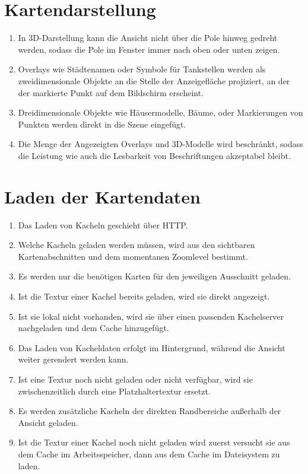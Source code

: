 \documentclass[10pt]{scrreprt}
\begin{document}
\section{Kartendarstellung}
\begin{enumerate}[leftmargin=2cm,resume]
\item In 3D-Darstellung kann die Ansicht nicht über die Pole hinweg gedreht werden, sodass die Pole im Fenster immer nach oben oder unten zeigen.
\item Overlays wie Städtenamen oder Symbole für Tankstellen werden als zweidimensionale Objekte an die Stelle der Anzeigefläche projiziert, an der der markierte Punkt auf dem Bildschirm erscheint.
\item \W Dreidimensionale Objekte wie Häusermodelle, Bäume, oder  Markierungen von Punkten werden direkt in die Szene eingefügt.
\item \W Die Menge der Angezeigten Overlays und 3D-Modelle wird beschränkt, sodass die Leistung wie auch die Lesbarkeit von Beschriftungen akzeptabel bleibt.
\end{enumerate}

\section{Laden der Kartendaten}
\begin{enumerate}[resume,leftmargin=2cm]
\item Das Laden von Kacheln geschieht über HTTP.
\item Welche Kacheln geladen werden müssen, wird  aus den sichtbaren Kartenabschnitten und dem momentanen Zoomlevel bestimmt.
\item Es werden nur die benötigen Karten für den jeweiligen Ausschnitt geladen.
\item Ist die Textur einer Kachel bereits geladen, wird sie direkt angezeigt.
\item Ist sie lokal nicht vorhanden, wird sie über einen passenden Kachelserver nachgeladen und dem Cache hinzugefügt.
\item Das Laden von Kacheldaten erfolgt im Hintergrund, während die Ansicht weiter gerendert werden kann.
\item \W Ist eine Textur noch nicht geladen oder nicht verfügbar, wird sie zwischenzeitlich durch eine Platzhaltertextur ersetzt.
\item \W Es werden zusätzliche Kacheln der direkten Randbereiche außerhalb der Ansicht geladen.
\item \W Ist die Textur einer Kachel noch nicht geladen wird zuerst versucht sie aus dem Cache im Arbeitsspeicher, dann aus dem Cache im Dateisystem zu laden.
\end{enumerate}
\end{document}

